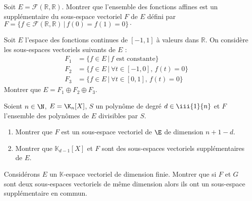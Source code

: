 \documentclass[a4paper,twoside,french,11pt]{VcCours}
\begin{document}
\begin{Exercice}{} Soit $E = \mathcal{F}(\mathbb{R}, \mathbb{R})$. Montrer que l'ensemble des fonctions affines est un supplémentaire du sous-espace vectoriel $F$ de $E$ défini par $F = \lbrace f \in \mathcal{F}(\mathbb{R}, \mathbb{R}) \, \vert \, f(0)=f(1)=0 \rbrace\cdot$
\end{Exercice}



\begin{Exercice}[$\bigstar$] Soit $E$ l'espace des fonctions continues de $[-1,1]$ à valeurs dans $\mathbb{R}$. On considère les sous-espaces vectoriels suivants de $E$ :
\begin{align*}
F_1 &= \lbrace f \in E \, \vert \, f{\text{~est constante}} \rbrace \\
F_2 &= \lbrace f \in E \, \vert \ \forall t \in [ - 1,0], \,  f(t)  = 0 \rbrace \\
F_3 & = \lbrace f \in E \, \vert \ \forall t \in [0,1], \,  f(t) = 0 \rbrace 
\end{align*}
Montrer que $E = F_1 \oplus F_2 \oplus F_3$.
\end{Exercice} 



\begin{Exercice}[$\bigstar$] 
  Soient $n\in\N$, $E=\K_n[X]$, $S$ un polynôme de degré $d \in \iii{1}{n}$ 
  et $F$ l'ensemble des polynômes de $E$ divisibles par $S$.
\begin{enumerate}
	\item Montrer que $F$ est un sous-espace vectoriel de $\E$ de dimension $n+1-d$.
	\item Montrer que $\mathbb{K}_{d-1}[X]$  et $F$ sont des sous-espaces 
  vectoriels supplémentaires de $E$.
\end{enumerate} 
\end{Exercice}


\begin{Exercice}[$\bigstar$] Considérons $E$ un $\mathbb{K}$-espace vectoriel de dimension finie. Montrer que si $F$ et $G$ sont deux sous-espaces vectoriels de même dimension alors ils ont un sous-espace supplémentaire en commun.
\end{Exercice}
\end{document}
